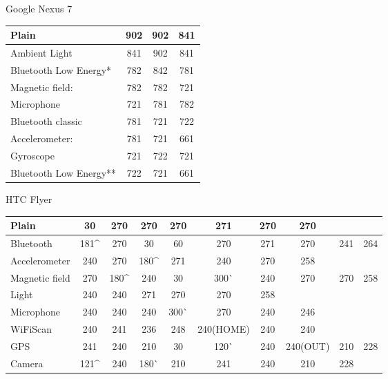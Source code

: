 	Google Nexus 7\\
\begin{table}
    \begin{tabular}{| l | c | c | c |}
    \hline
    Plain                  & 902 & 902 & 841 \\ \hline
    Ambient Light          & 841 & 902 & 841\\ \hline
    Bluetooth Low Energy*  & 782 & 842 & 781 \\ \hline
    Magnetic field:        & 782 & 782 & 721\\ \hline
    Microphone             & 721 & 781 & 782 \\ \hline
    Bluetooth classic      & 781 & 721 & 722 \\ \hline
    Accelerometer:         & 781 & 721 & 661 \\ \hline
    Gyroscope              & 721 & 722 & 721 \\ \hline
    Bluetooth Low Energy** & 722 & 721 & 661 \\ \hline
    \end{tabular}
\end{table}


   HTC Flyer\\
\begin{table}
    \begin{tabular}{| l | c | c | c | c | c | c | c | c | c |}
    \hline
    Plain          & \cellcolor{red!25}30  & 270  & 270   & 270   & 271       & 270 & 270      & ~   & ~   \\ \hline
    Bluetooth      & 181\^ & 270  & \cellcolor{red!25}30   & \cellcolor{red!25}60   & 270       & 271 & 270      & 241 & 264 \\ \hline
    Accelerometer  & 240  & 270  & 180\^ & 271   & 240       & 270 & 258      & ~   & ~   \\ \hline
    Magnetic field & 270  & 180\^ & 240   & \cellcolor{red!25}30   & 300^^   & 240 & 270      & 270 & 258 \\ \hline
    Light          & 240  & 240  & 271   & 270   & 270       & 258 & ~        & ~   & ~   \\ \hline
    Microphone     & 240  & 240  & 240   & 300^^ & 270       & 240 & 246      & ~   & ~   \\ \hline
    WiFiScan       & 240  & 241  & 236   & 248   & 240(HOME) & 240 & 240      & ~   & ~   \\ \hline
    GPS            & 241  & 240  & 210   & \cellcolor{red!25}30   & 120^^   & 240 & 240(OUT) & 210 & 228 \\ \hline
    Camera         & 121\^ & 240  & 180^^ & 210   & 241       & 240 & 210      & 228 & ~   \\ \hline
    \end{tabular}
\end{table}

